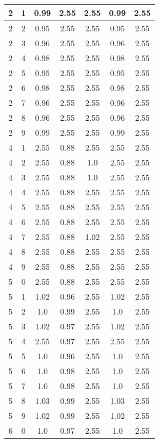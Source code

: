 \begin{longtable}{|c|c||c||c|c||c|c|}
	2 & 1 & 0.99 & 2.55 & 2.55 & 0.99 & 2.55 \\ \hline
	2 & 2 & 0.95 & 2.55 & 2.55 & 0.95 & 2.55 \\ \hline
	2 & 3 & 0.96 & 2.55 & 2.55 & 0.96 & 2.55 \\ \hline
	2 & 4 & 0.98 & 2.55 & 2.55 & 0.98 & 2.55 \\ \hline
	2 & 5 & 0.95 & 2.55 & 2.55 & 0.95 & 2.55 \\ \hline
	2 & 6 & 0.98 & 2.55 & 2.55 & 0.98 & 2.55 \\ \hline
	2 & 7 & 0.96 & 2.55 & 2.55 & 0.96 & 2.55 \\ \hline
	2 & 8 & 0.96 & 2.55 & 2.55 & 0.96 & 2.55 \\ \hline
	2 & 9 & 0.99 & 2.55 & 2.55 & 0.99 & 2.55 \\ \hline
	4 & 1 & 2.55 & 0.88 & 2.55 & 2.55 & 2.55 \\ \hline
	4 & 2 & 2.55 & 0.88 & 1.0 & 2.55 & 2.55 \\ \hline
	4 & 3 & 2.55 & 0.88 & 1.0 & 2.55 & 2.55 \\ \hline
	4 & 4 & 2.55 & 0.88 & 2.55 & 2.55 & 2.55 \\ \hline
	4 & 5 & 2.55 & 0.88 & 2.55 & 2.55 & 2.55 \\ \hline
	4 & 6 & 2.55 & 0.88 & 2.55 & 2.55 & 2.55 \\ \hline
	4 & 7 & 2.55 & 0.88 & 1.02 & 2.55 & 2.55 \\ \hline
	4 & 8 & 2.55 & 0.88 & 2.55 & 2.55 & 2.55 \\ \hline
	4 & 9 & 2.55 & 0.88 & 2.55 & 2.55 & 2.55 \\ \hline
	5 & 0 & 2.55 & 0.88 & 2.55 & 2.55 & 2.55 \\ \hline
	5 & 1 & 1.02 & 0.96 & 2.55 & 1.02 & 2.55 \\ \hline
	5 & 2 & 1.0 & 0.99 & 2.55 & 1.0 & 2.55 \\ \hline
	5 & 3 & 1.02 & 0.97 & 2.55 & 1.02 & 2.55 \\ \hline
	5 & 4 & 2.55 & 0.97 & 2.55 & 2.55 & 2.55 \\ \hline
	5 & 5 & 1.0 & 0.96 & 2.55 & 1.0 & 2.55 \\ \hline
	5 & 6 & 1.0 & 0.98 & 2.55 & 1.0 & 2.55 \\ \hline
	5 & 7 & 1.0 & 0.98 & 2.55 & 1.0 & 2.55 \\ \hline
	5 & 8 & 1.03 & 0.99 & 2.55 & 1.03 & 2.55 \\ \hline
	5 & 9 & 1.02 & 0.99 & 2.55 & 1.02 & 2.55 \\ \hline
	6 & 0 & 1.0 & 0.97 & 2.55 & 1.0 & 2.55 \\ \hline

\end{longtable}
